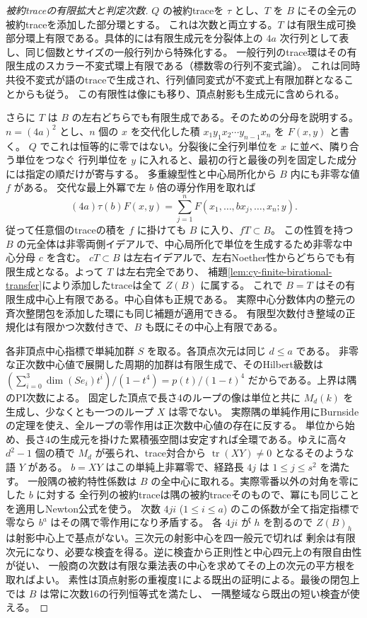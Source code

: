 \begin{proof}[被約traceの有限拡大と判定次数]
$Q$ の被約traceを $\tau$ とし、$T$ を $B$ にその全元の被約traceを添加した部分環とする。
これは次数と両立する。$T$ は有限生成可換部分環上有限である。具体的には有限生成元を分裂体上の
$4a$ 次行列として表し、同じ個数とサイズの一般行列から特殊化する。
一般行列のtrace環はその有限生成のスカラー不変式環上有限である（標数零の行列不変式論）。
これは同時共役不変式が語のtraceで生成され、行列値同変式が不変式上有限加群となることからも従う。
この有限性は像にも移り、頂点射影も生成元に含められる。

さらに $T$ は $B$ の左右どちらでも有限生成である。そのための分母を説明する。
$n=(4a)^2$ とし、$n$ 個の $x$ を交代化した積 $x_1 y_1 x_2\cdots y_{n-1}x_n$ を $F(x,y)$ と書く。
$Q$ でこれは恒等的に零ではない。分裂後に全行列単位を $x$ に並べ、隣り合う単位をつなぐ
行列単位を $y$ に入れると、最初の行と最後の列を固定した成分には指定の順だけが寄与する。
多重線型性と中心局所化から $B$ 内にも非零な値 $f$ がある。
交代な最上外冪で左 $b$ 倍の導分作用を取れば
\[
 (4a)\tau(b)F(x,y)=\sum_{j=1}^n F(x_1,\ldots,bx_j,\ldots,x_n;y).
\]
従って任意個のtraceの積を $f$ に掛けても $B$ に入り、$fT\subset B$。
この性質を持つ $B$ の元全体は非零両側イデアルで、中心局所化で単位を生成するため非零な中心分母 $c$ を含む。
$cT\subset B$ は左右イデアルで、左右Noether性からどちらでも有限生成となる。よって $T$ は左右完全であり、
補題\ref{lem:cy-finite-birational-transfer}により添加したtraceは全て $Z(B)$ に属する。
これで $B=T$ はその有限生成中心上有限である。中心自体も正規である。
実際中心分数体内の整元の斉次整閉包を添加した環にも同じ補題が適用できる。
有限型次数付き整域の正規化は有限かつ次数付きで、$B$ も既にその中心上有限である。

各非頂点中心指標で単純加群 $S$ を取る。各頂点次元は同じ $d\le a$ である。
非零な正次数中心値で展開した周期的加群は有限生成で、そのHilbert級数は
$(\sum_{i=0}^3\dim(Se_i)t^i)/(1-t^4)=p(t)/(1-t)^4$ だからである。上界は隅のPI次数による。
固定した頂点で長さ4のループの像は単位と共に $M_d(k)$ を生成し、少なくとも一つのループ $X$ は零でない。
実際隅の単純作用にBurnsideの定理を使え、全ループの零作用は正次数中心値の存在に反する。
単位から始め、長さ4の生成元を掛けた累積張空間は安定すれば全環である。ゆえに高々 $d^2-1$ 個の積で
$M_d$ が張られ、trace対合から $\operatorname{tr}(XY)\ne0$ となるそのような語 $Y$ がある。
$b=XY$ はこの単純上非冪零で、経路長 $4j$ は $1\le j\le s^2$ を満たす。
一般隅の被約特性係数は $B$ の全中心に取れる。実際零番以外の対角を零にした $b$ に対する
全行列の被約traceは隅の被約traceそのもので、冪にも同じことを適用しNewton公式を使う。
次数 $4ji$ ($1\le i\le a$) のこの係数が全て指定指標で零なら $b^a$ はその隅で零作用になり矛盾する。
各 $4ji$ が $h$ を割るので $Z(B)_h$ は射影中心上で基点がない。三次元の射影中心を四一般元で切れば
剰余は有限次元になり、必要な検査を得る。逆に検査から正則性と中心四元上の有限自由性が従い、
一般商の次数は有限な乗法表の中心を求めてその上の次元の平方根を取ればよい。
素性は頂点射影の重複度1による既出の証明による。最後の閉包上では $B$ は常に次数16の行列恒等式を満たし、
一隅整域なら既出の短い検査が使える。
\end{proof}
